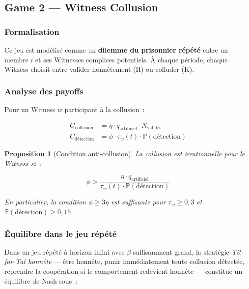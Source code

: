 \documentclass[12pt,a4paper]{article}
\theoremstyle{definition}
\theoremstyle{plain}
\newtheorem{proposition}{Proposition}[section]
\theoremstyle{remark}
\newcommand{\trustscore}{\tau}
\newcommand{\1}{\mathbf{1}}
\begin{document}
\subsection{Game 2 --- Witness Collusion}

\subsubsection{Formalisation}

Ce jeu est modélisé comme un \textbf{dilemme du prisonnier répété} entre un
membre $i$ et ses Witnesses complices potentiels. À chaque période, chaque
Witness choisit entre valider honnêtement (H) ou colluder (K).

\subsubsection{Analyse des payoffs}

Pour un Witness $w$ participant à la collusion~:

\begin{align}
G_{\text{collusion}} &= \eta \cdot q_{\text{artificiel}} \cdot N_{\text{validés}} \\
C_{\text{détection}} &= \phi \cdot \trustscore_w(t) \cdot \mathbb{P}(\text{détection})
\end{align}

\begin{proposition}[Condition anti-collusion]
La collusion est irrationnelle pour le Witness si~:

\begin{equation}
\phi > \frac{\eta \cdot q_{\text{artificiel}}}{\trustscore_w(t) \cdot \mathbb{P}(\text{détection})}
\label{eq:anticollusion}
\end{equation}

En particulier, la condition $\phi \geq 3\eta$ est suffisante pour
$\trustscore_w \geq 0{,}3$ et $\mathbb{P}(\text{détection}) \geq 0{,}15$.
\end{proposition}

\subsubsection{Équilibre dans le jeu répété}

Dans un jeu répété à horizon infini avec $\beta$ suffisamment grand, la
stratégie \textit{Tit-for-Tat honnête} --- être honnête, punir immédiatement
toute collusion détectée, reprendre la coopération si le comportement redevient
honnête --- constitue un équilibre de Nash sous~:
\end{document}
